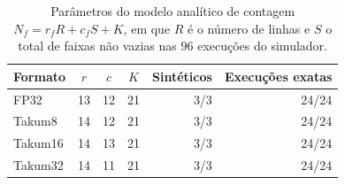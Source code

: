 \begin{table}[t]
\caption{Par\^ametros do modelo anal\'itico de contagem $N_f = r_f R + c_f S + K$, em que $R$ \'e o n\'umero de linhas e $S$ o total de faixas n\~ao vazias nas 96 execu\c{c}\~oes do simulador.}
\label{tab:modelo}
\centering
\scriptsize
\setlength{\tabcolsep}{3.0pt}
\renewcommand{\arraystretch}{0.95}
\begin{tabular}{@{}lcccrr@{}}
\toprule
Formato & $r$ & $c$ & $K$ & Sint\'eticos & Execu\c{c}\~oes exatas \\
\midrule
FP32 & 13 & 12 & 21 & 3/3 & 24/24 \\
Takum8 & 14 & 12 & 21 & 3/3 & 24/24 \\
Takum16 & 14 & 13 & 21 & 3/3 & 24/24 \\
Takum32 & 14 & 11 & 21 & 3/3 & 24/24 \\
\bottomrule
\end{tabular}
\end{table}
